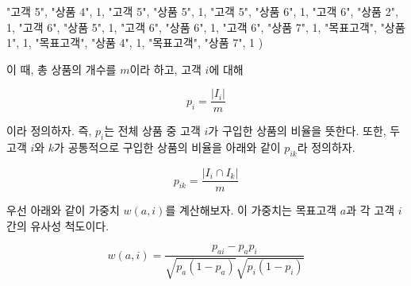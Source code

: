\documentclass[]{book}
\newenvironment{Shaded}{\begin{snugshade}}{\end{snugshade}}
\newcommand{\DecValTok}[1]{\textcolor[rgb]{0.00,0.00,0.81}{#1}}
\newcommand{\NormalTok}[1]{#1}
\newcommand{\StringTok}[1]{\textcolor[rgb]{0.31,0.60,0.02}{#1}}
\begin{document}
\begin{Shaded}
\begin{Highlighting}[]
  \StringTok{"고객 5"}\NormalTok{, }\StringTok{"상품 4"}\NormalTok{, }\DecValTok{1}\NormalTok{,}
  \StringTok{"고객 5"}\NormalTok{, }\StringTok{"상품 5"}\NormalTok{, }\DecValTok{1}\NormalTok{,}
  \StringTok{"고객 5"}\NormalTok{, }\StringTok{"상품 6"}\NormalTok{, }\DecValTok{1}\NormalTok{,}
  \StringTok{"고객 6"}\NormalTok{, }\StringTok{"상품 2"}\NormalTok{, }\DecValTok{1}\NormalTok{,}
  \StringTok{"고객 6"}\NormalTok{, }\StringTok{"상품 5"}\NormalTok{, }\DecValTok{1}\NormalTok{,}
  \StringTok{"고객 6"}\NormalTok{, }\StringTok{"상품 6"}\NormalTok{, }\DecValTok{1}\NormalTok{,}
  \StringTok{"고객 6"}\NormalTok{, }\StringTok{"상품 7"}\NormalTok{, }\DecValTok{1}\NormalTok{,}
  \StringTok{"목표고객"}\NormalTok{, }\StringTok{"상품 1"}\NormalTok{, }\DecValTok{1}\NormalTok{,}
  \StringTok{"목표고객"}\NormalTok{, }\StringTok{"상품 4"}\NormalTok{, }\DecValTok{1}\NormalTok{,}
  \StringTok{"목표고객"}\NormalTok{, }\StringTok{"상품 7"}\NormalTok{, }\DecValTok{1}
\NormalTok{)}
\end{Highlighting}
\end{Shaded}

이 때, 총 상품의 개수를 \(m\)이라 하고, 고객 \(i\)에 대해

\begin{equation*}
p_i = \frac{|I_i|}{m}
\end{equation*}

이라 정의하자. 즉, \(p_i\)는 전체 상품 중 고객 \(i\)가 구입한 상품의 비율을 뜻한다. 또한, 두 고객 \(i\)와 \(k\)가 공통적으로 구입한 상품의 비율을 아래와 같이 \(p_{ik}\)라 정의하자.

\begin{equation*}
p_{ik} = \frac{|I_i \cap I_k|}{m}
\end{equation*}

우선 아래와 같이 가중치 \(w(a, i)\)를 계산해보자. 이 가중치는 목표고객 \(a\)과 각 고객 \(i\)간의 유사성 척도이다.

\begin{equation*}
w(a, i) = \frac{p_{ai} - p_a p_i}{\sqrt{p_a (1 - p_a)} \sqrt{p_i (1 - p_i)}}
\end{equation*}
\end{document}
